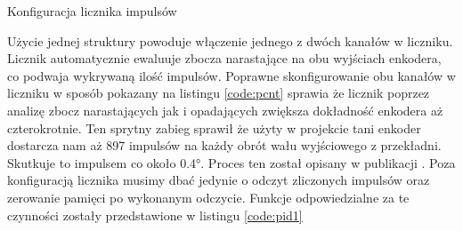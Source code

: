             \begin{kod}
              \inputminted[firstline=5,lastline=48]{cpp}{esp/listings/encoder_driver.cpp}
              \caption{Konfiguracja licznika impulsów}
              \label{code:pcnt}
              \vspace{2em}
            \end{kod} 
            
            Użycie jednej struktury powoduje włączenie jednego z dwóch kanałów w liczniku. Licznik automatycznie ewaluuje zbocza narastające na obu wyjściach enkodera, co podwaja wykrywaną ilość impulsów. Poprawne skonfigurowanie obu kanałów w liczniku w sposób pokazany na listingu \ref{code:pcnt} sprawia że licznik poprzez analizę zbocz narastających jak i opadających zwiększa dokładność enkodera aż czterokrotnie. Ten sprytny zabieg sprawił że użyty w projekcie tani enkoder dostarcza nam aż 897 impulsów na każdy obrót wału wyjściowego z przekładni. Skutkuje to impulsem co około 0.4°. Proces ten został opisany w publikacji \cite{enkoder}. Poza konfiguracją licznika musimy dbać jedynie o odczyt zliczonych impulsów oraz zerowanie pamięci po wykonanym odczycie. Funkcje odpowiedzialne za te czynności zostały przedstawione w listingu \ref{code:pid1}